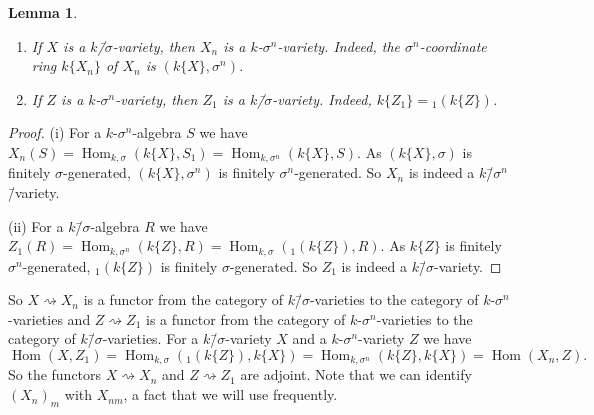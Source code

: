 \documentclass[oneside,reqno]{amsart}
\newtheorem{lemma}[theo]{Lemma}
\theoremstyle{definition}
\newcommand{\Hom}{\operatorname{Hom}}
\newcommand{\s}{\sigma}
\newcommand{\ks}{$k$\=/$\s$}
\begin{document}
 \begin{lemma} \mbox{ } \label{lem: X1 Xn}
 	\begin{enumerate}
 		\item If $X$ is a \ks-variety, then $X_n$ is a $k$-$\s^n$-variety. Indeed, the $\s^n$-coordinate ring $k\{X_n\}$ of $X_n$ is $(k\{X\},\s^n)$. 
 		\item If $Z$ is a $k$-$\s^n$-variety, then $Z_1$ is a \ks-variety. Indeed, $k\{Z_1\}={_1 (k\{Z\})}$.
 		
 	\end{enumerate}
 \end{lemma}
 \begin{proof}  	
 	(i) For a $k$-$\s^n$-algebra $S$ we have $X_n(S)=\Hom_{k,\s}(k\{X\},S_1)=\Hom_{k,\s^n}(k\{X\},S)$. 
 	 As $(k\{X\},\s)$ is finitely $\s$-generated, $(k\{X\},\s^n)$ is finitely $\s^n$-generated. So $X_n$ is indeed a $k$\=/$\s^n$\=/variety.
 	 
 	(ii) For a \ks-algebra $R$ we have $Z_1(R)=\Hom_{k,\s^n}(k\{Z\},R)=\Hom_{k,\s}({_1 (k\{Z\})},R)$. As $k\{Z\}$ is finitely $\s^n$-generated, $_1(k\{Z\})$ is finitely $\s$-generated. So $Z_1$ is indeed a \ks-variety.
 \end{proof}
 
 So $X\rightsquigarrow X_n$ is a functor from the category of \ks-varieties to the category of $k$-$\s^n$-varieties and $Z\rightsquigarrow Z_1$ is a functor from the category of $k$-$\s^n$-varieties to the category of \ks-varieties. 
 For a \ks-variety $X$ and a $k$-$\s^n$-variety $Z$ we have
 $$\Hom(X,Z_1)=\Hom_{k,\s}({_1(k\{Z\})}, k\{X\})=\Hom_{k,\s^n}(k\{Z\},k\{X\})=\Hom(X_n,Z).$$ 
 So the functors $X\rightsquigarrow X_n$ and $Z\rightsquigarrow Z_1$ are adjoint. Note that we can identify $(X_n)_m$ with $X_{nm}$, a fact that we will use frequently.
\end{document}
